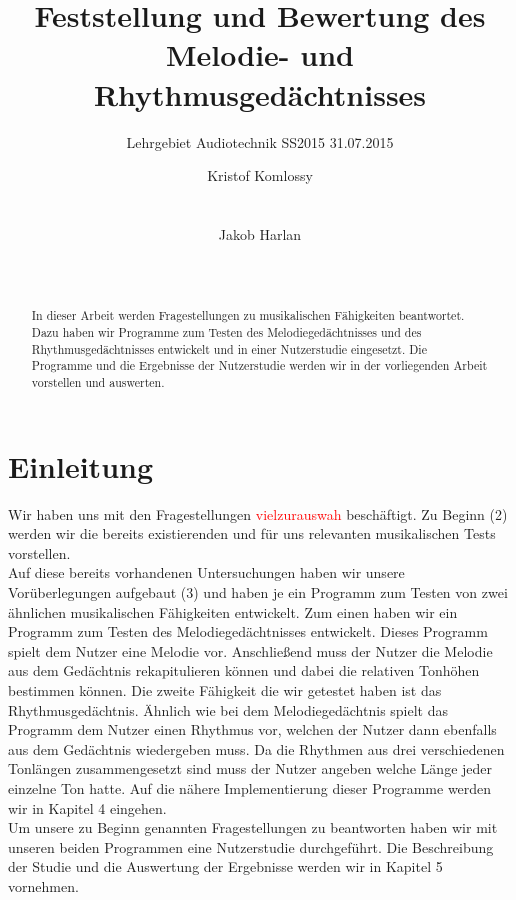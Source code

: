 \documentclass{acm_proc_article-sp}
\begin{document}
\title{Feststellung und Bewertung des Melodie- und Rhythmusgedächtnisses}
\subtitle{Lehrgebiet Audiotechnik SS2015 31.07.2015}

\author{
\alignauthor
Kristof Komlossy\\
       \\
       \\
\alignauthor
Jakob Harlan\\
       \\
       \\
} %

\maketitle

\begin{abstract}
In dieser Arbeit werden Fragestellungen zu musikalischen Fähigkeiten beantwortet. Dazu haben wir Programme zum Testen des Melodiegedächtnisses und des Rhythmusgedächtnisses entwickelt und in einer Nutzerstudie eingesetzt. Die Programme und die Ergebnisse der Nutzerstudie werden wir in der vorliegenden Arbeit vorstellen und auswerten.
\end{abstract}

\section{Einleitung}
Wir haben uns mit den Fragestellungen \textcolor{red}{vielzurauswah} beschäftigt. 
Zu Beginn (2) werden wir die bereits existierenden und für uns relevanten musikalischen Tests vorstellen.\\
Auf diese bereits vorhandenen Untersuchungen haben wir unsere Vorüberlegungen aufgebaut (3) und haben je ein Programm zum Testen von zwei ähnlichen musikalischen Fähigkeiten entwickelt. Zum einen haben wir ein Programm zum Testen des Melodiegedächtnisses entwickelt. Dieses Programm spielt dem Nutzer eine Melodie vor. Anschließend muss der Nutzer die Melodie aus dem Gedächtnis rekapitulieren können und dabei die relativen Tonhöhen bestimmen können.
Die zweite Fähigkeit die wir getestet haben ist das Rhythmusgedächtnis. Ähnlich wie bei dem Melodiegedächtnis spielt das Programm dem Nutzer einen Rhythmus vor, welchen der Nutzer dann ebenfalls aus dem Gedächtnis wiedergeben muss. Da die Rhythmen aus drei verschiedenen Tonlängen zusammengesetzt sind muss der Nutzer angeben welche Länge jeder einzelne Ton hatte. Auf die nähere Implementierung dieser Programme werden wir in Kapitel 4 eingehen.\\
Um unsere zu Beginn genannten Fragestellungen zu beantworten haben wir mit unseren beiden Programmen eine Nutzerstudie durchgeführt. Die Beschreibung der Studie und die Auswertung der Ergebnisse werden wir in Kapitel 5 vornehmen.
\end{document}
